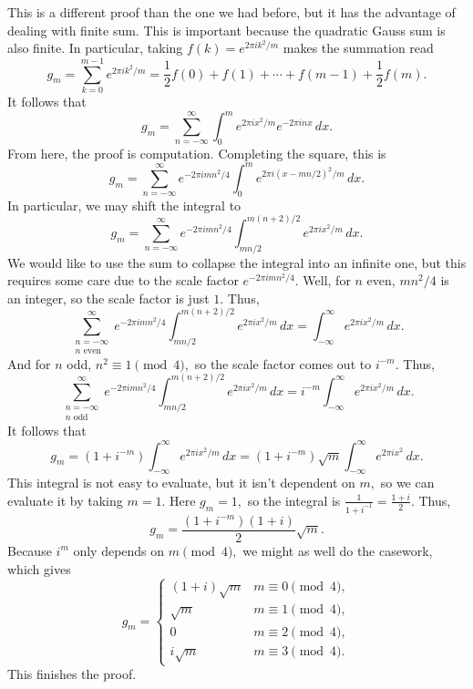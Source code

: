 This is a different proof than the one we had before, but it has the advantage of dealing with finite sum. This is important because the quadratic Gauss sum is also finite. In particular, taking $f(k)=e^{2\pi ik^2/m}$ makes the summation read
\[g_m=\sum_{k=0}^{m-1}e^{2\pi ik^2/m}=\frac12f(0)+f(1)+\cdots+f(m-1)+\frac12f(m).\]
It follows that
\[g_m=\sum_{n=-\infty}^\infty\int_0^me^{2\pi ix^2/m}e^{-2\pi inx}\,dx.\]
From here, the proof is computation. Completing the square, this is
\[g_m=\sum_{n=-\infty}^\infty e^{-2\pi imn^2/4}\int_0^me^{2\pi i(x-mn/2)^2/m}\,dx.\]
In particular, we may shift the integral to
\[g_m=\sum_{n=-\infty}^\infty e^{-2\pi imn^2/4}\int_{mn/2}^{m(n+2)/2}e^{2\pi ix^2/m}\,dx.\]
We would like to use the sum to collapse the integral into an infinite one, but this requires some care due to the scale factor $e^{-2\pi imn^2/4}.$ Well, for $n$ even, $mn^2/4$ is an integer, so the scale factor is just $1.$ Thus,
\[\sum_{\substack{n=-\infty\\n\text{ even}}}^\infty e^{-2\pi imn^2/4}\int_{mn/2}^{m(n+2)/2}e^{2\pi ix^2/m}\,dx=\int_{-\infty}^\infty e^{2\pi ix^2/m}\,dx.\]
And for $n$ odd, $n^2\equiv1\pmod4,$ so the scale factor comes out to $i^{-m}.$ Thus,
\[\sum_{\substack{n=-\infty\\n\text{ odd}}}^\infty e^{-2\pi imn^2/4}\int_{mn/2}^{m(n+2)/2}e^{2\pi ix^2/m}\,dx=i^{-m}\int_{-\infty}^\infty e^{2\pi ix^2/m}\,dx.\]
It follows that
\[g_m=\left(1+i^{-m}\right)\int_{-\infty}^\infty e^{2\pi ix^2/m}\,dx=\left(1+i^{-m}\right)\sqrt m\int_{-\infty}^\infty e^{2\pi ix^2}\,dx.\]
This integral is not easy to evaluate, but it isn't dependent on $m,$ so we can evaluate it by taking $m=1.$ Here $g_m=1,$ so the integral is $\frac1{1+i^{-1}}=\frac{1+i}2.$ Thus,
\[g_m=\frac{\left(1+i^{-m}\right)(1+i)}2\sqrt m.\]
Because $i^m$ only depends on $m\pmod4,$ we might as well do the casework, which gives
\[\boxed{g_m=\begin{cases}
    (1+i)\sqrt m & m\equiv0\pmod4, \\
    \sqrt m & m\equiv1\pmod4, \\
    0 & m\equiv2\pmod4, \\
    i\sqrt m & m\equiv3\pmod4.
\end{cases}}\]
This finishes the proof.


